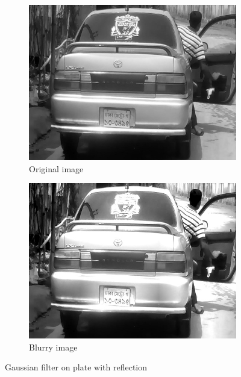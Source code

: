 \begin{figure}
\begin{subfigure}{0.5\textwidth}
    \centering
    \includegraphics[width=0.9\linewidth]{./img/experiment/stage.2/light}
    \caption{Original image}
\end{subfigure}
\begin{subfigure}{0.5\textwidth}
    \centering
    \includegraphics[width=0.9\linewidth]{./img/experiment/stage.5/light}
    \caption{Blurry image}
\end{subfigure}
\caption{Gaussian filter on plate with reflection}
\label{fig:EnhanceResult2}
\end{figure}

